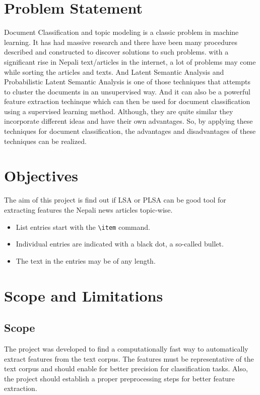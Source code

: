 \documentclass[12pt]{report}
\begin{document}
        
        
        



        

        
    \section{Problem Statement}
        Document Classification and topic modeling is a classic problem in machine learning. It has had massive research and there have been many procedures described and
        constructed to discover solutions to such problems. with a significant rise in Nepali text/articles in the internet, a lot of problems may come 
        while sorting the articles and texts. And Latent Semantic Analysis and Probabilistic Latent Semantic Analysis is one of those techniques that attempts 
        to cluster the documents in an unsupervised way. And it can also be a powerful feature extraction techinque which can then be used for document classification using a 
        supervised learning method. Although, they are quite similar they incorporate different ideas and have their own advantages. So, by applying these techniques for document classification, 
        the advantages and disadvantages of these techniques can be realized. 
    
    \section{Objectives}
        The aim of this project is find out if LSA or PLSA can be good tool for extracting features the Nepali news articles topic-wise.
        \begin{itemize}
            \item List entries start with the \verb|\item| command.
            \item Individual entries are indicated with a black dot, a so-called bullet.
            \item The text in the entries may be of any length.
        \end{itemize}
    
    \section{Scope and Limitations}
        
        \subsection{Scope}
        The project was developed to find a computationally fast way to automatically extract features from the text corpus. 
        The features must be representative of the text corpus and should enable for better precision for classification tasks. 
        Also, the project should establish a proper preprocessing steps for better feature extraction.
\end{document}
